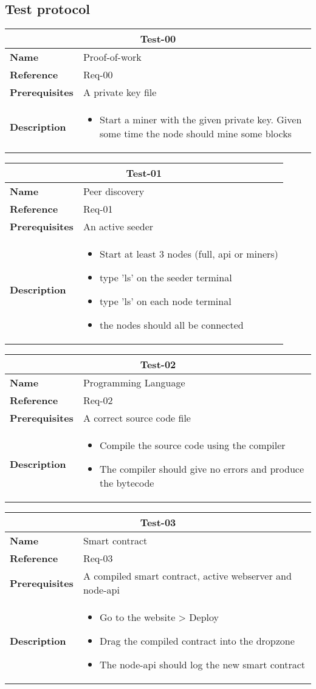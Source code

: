 \documentclass[../documentation.tex]{subfiles}
\begin{document}
\newcommand{\requirement}[5]{
    \bgroup{}
    \def\arraystretch{1.25}
    \begin{center}
        \begin{tabular}{ |l|p{9cm}| }
            \hline
            \multicolumn{2}{|c|}{\textbf{Test-#1}} \\
            \hline
            \textbf{Name} & #2 \\
            \hline
            \textbf{Reference} & #3 \\
            \hline
            \textbf{Prerequisites} & #4 \\
            \hline
            \textbf{Description} &
            \begin{itemize}
                #5
            \end{itemize} \\
            \hline
        \end{tabular}
    \end{center}
    \egroup{}
}

\subsection{Test protocol}

\requirement{00}
    {Proof-of-work}
    {Req-00}
    {A private key file}
    {\item Start a miner with the given private key. Given some time
    the node should mine some blocks}

\requirement{01}
    {Peer discovery}
    {Req-01}
    {An active seeder}
    {
        \item Start at least 3 nodes (full, api or miners)
        \item type 'ls' on the seeder terminal
        \item type 'ls' on each node terminal
        \item the nodes should all be connected 
    }

    \requirement{02}
    {Programming Language}
    {Req-02}
    {A correct source code file}
    {
        \item Compile the source code using the compiler
        \item The compiler should give no errors and produce the bytecode
    }

\requirement{03}
    {Smart contract}
    {Req-03}
    {A compiled smart contract, active webserver and node-api}
    {
        \item Go to the website > Deploy
        \item Drag the compiled contract into the dropzone
        \item The node-api should log the new smart contract
    }
\end{document}
